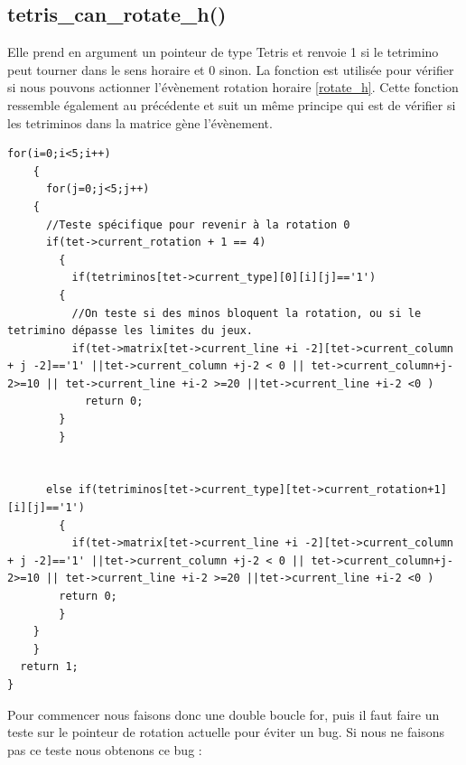 \documentclass[a4paper,10p]{report}
\begin{document}
\subsection{tetris\_can\_rotate\_h()}
\label{tetris_can_rotate_h}
Elle prend en argument un pointeur de type Tetris et renvoie 1 si le tetrimino peut tourner dans le sens horaire et 0 sinon.
La fonction est utilisée pour vérifier si nous pouvons actionner l'évènement rotation horaire \ref{rotate_h}.
Cette fonction ressemble également au précédente et suit un même principe qui est de vérifier si les tetriminos dans la matrice gène l'évènement.
\begin{lstlisting}
for(i=0;i<5;i++)
    {
      for(j=0;j<5;j++)
	{
	  //Teste spécifique pour revenir à la rotation 0
	  if(tet->current_rotation + 1 == 4)
	    {
	      if(tetriminos[tet->current_type][0][i][j]=='1')
		{
		  //On teste si des minos bloquent la rotation, ou si le tetrimino dépasse les limites du jeux.
		  if(tet->matrix[tet->current_line +i -2][tet->current_column + j -2]=='1' ||tet->current_column +j-2 < 0 || tet->current_column+j-2>=10 || tet->current_line +i-2 >=20 ||tet->current_line +i-2 <0 )
		    return 0;
		}
	    }
	
	      
	  else if(tetriminos[tet->current_type][tet->current_rotation+1][i][j]=='1')
	    {
	      if(tet->matrix[tet->current_line +i -2][tet->current_column + j -2]=='1' ||tet->current_column +j-2 < 0 || tet->current_column+j-2>=10 || tet->current_line +i-2 >=20 ||tet->current_line +i-2 <0 )
		return 0;
	    }
	}
    }
  return 1;
}
\end{lstlisting}
Pour commencer nous faisons donc une double boucle for, puis il faut faire un teste sur le pointeur de rotation actuelle pour éviter un bug. Si nous ne faisons pas ce teste nous obtenons ce bug :
\end{document}
